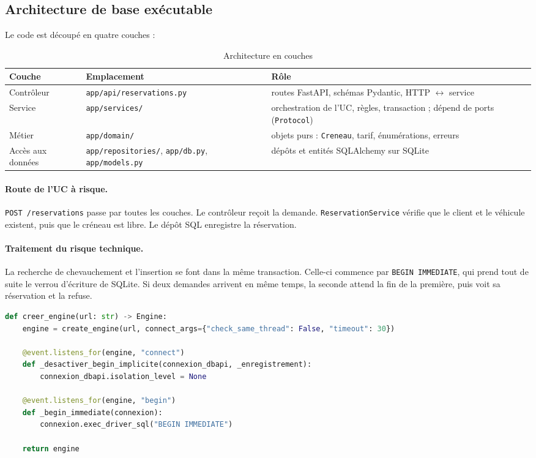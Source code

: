 \documentclass[11pt,a4paper]{article}
\begin{document}
\subsection{Architecture de base exécutable}

Le code est découpé en quatre couches :

\begin{table}[H]
\centering
\begin{tabularx}{\textwidth}{l l L}
\toprule
\textbf{Couche} & \textbf{Emplacement} & \textbf{Rôle} \\
\midrule
Contrôleur & \texttt{app/api/reservations.py} & routes FastAPI, schémas Pydantic, HTTP $\leftrightarrow$ service \\
Service & \texttt{app/services/} & orchestration de l'UC, règles, transaction ; dépend de ports (\texttt{Protocol}) \\
Métier & \texttt{app/domain/} & objets purs : \texttt{Creneau}, tarif, énumérations, erreurs \\
Accès aux données & \texttt{app/repositories/}, \texttt{app/db.py}, \texttt{app/models.py} & dépôts et entités SQLAlchemy sur SQLite \\
\bottomrule
\end{tabularx}
\caption{Architecture en couches}
\end{table}

\paragraph{Route de l'UC à risque.}
\texttt{POST /reservations} passe par toutes les couches. Le contrôleur reçoit la
demande. \texttt{ReservationService} vérifie que le client et le véhicule existent,
puis que le créneau est libre. Le dépôt SQL enregistre la réservation.

\paragraph{Traitement du risque technique.}
La recherche de chevauchement et l'insertion se font dans la même transaction.
Celle-ci commence par \texttt{BEGIN IMMEDIATE}, qui prend tout de suite le verrou
d'écriture de SQLite. Si deux demandes arrivent en même temps, la seconde attend la
fin de la première, puis voit sa réservation et la refuse.

\begin{lstlisting}[language=Python,caption={\texttt{app/db.py} : transaction \texttt{BEGIN IMMEDIATE}}]
def creer_engine(url: str) -> Engine:
    engine = create_engine(url, connect_args={"check_same_thread": False, "timeout": 30})

    @event.listens_for(engine, "connect")
    def _desactiver_begin_implicite(connexion_dbapi, _enregistrement):
        connexion_dbapi.isolation_level = None

    @event.listens_for(engine, "begin")
    def _begin_immediate(connexion):
        connexion.exec_driver_sql("BEGIN IMMEDIATE")

    return engine
\end{lstlisting}
\end{document}
